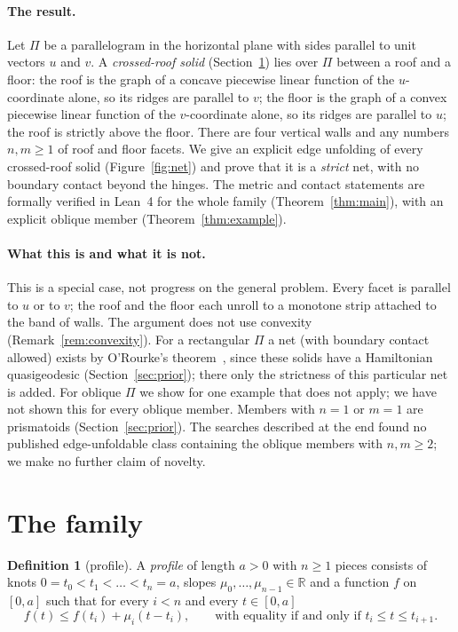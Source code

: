\documentclass[11pt]{article}
\theoremstyle{definition}
\newtheorem{definition}{Definition}
\theoremstyle{remark}
\newcommand{\R}{\mathbb R}
\begin{document}
\paragraph{The result.} Let $\Pi$ be a parallelogram in the horizontal plane
with sides parallel to unit vectors $u$ and $v$. A \emph{crossed-roof solid}
(Section~\ref{sec:family}) lies over $\Pi$ between a roof and a floor: the
roof is the graph of a concave piecewise linear function of the
$u$-coordinate alone, so its ridges are parallel to $v$; the floor is the
graph of a convex piecewise linear function of the $v$-coordinate alone, so
its ridges are parallel to $u$; the roof is strictly above the floor. There
are four vertical walls and any numbers $n,m\ge1$ of roof and floor facets.
We give an explicit edge unfolding of every crossed-roof solid
(Figure~\ref{fig:net}) and prove that it is a \emph{strict} net, with no
boundary contact beyond the hinges. The metric and contact statements are formally verified in
Lean~4 for the whole family (Theorem~\ref{thm:main}), with an explicit oblique
member (Theorem~\ref{thm:example}).

\paragraph{What this is and what it is not.} This is a special case, not
progress on the general problem. Every facet is parallel to $u$ or to $v$; the
roof and the floor each unroll to a monotone strip attached to the band of
walls. The argument does not use
convexity (Remark~\ref{rem:convexity}). For a rectangular $\Pi$ a net (with
boundary contact allowed) exists by O'Rourke's
theorem~\cite[Theorem~1]{oro22}, since these solids have a Hamiltonian
quasigeodesic (Section~\ref{sec:prior}); there only the strictness of this
particular net is added. For oblique $\Pi$ we show for one example that
\cite{oro22} does not apply; we have not shown this for every oblique member.
Members with $n=1$ or $m=1$ are prismatoids (Section~\ref{sec:prior}). The
searches described at the end found no published edge-unfoldable class
containing the oblique members with $n,m\ge2$; we make no further claim of
novelty.

\section{The family}\label{sec:family}

\begin{definition}[profile]\label{def:profile}
A \emph{profile} of length $a>0$ with $n\ge1$ pieces consists of knots
$0=t_0<t_1<\dots<t_n=a$, slopes $\mu_0,\dots,\mu_{n-1}\in\R$ and a function
$f$ on $[0,a]$ such that for every $i<n$ and every $t\in[0,a]$
\[
f(t)\le f(t_i)+\mu_i(t-t_i),\qquad\text{with equality if and only if } t_i\le t\le t_{i+1}.
\]
\end{definition}
\end{document}
